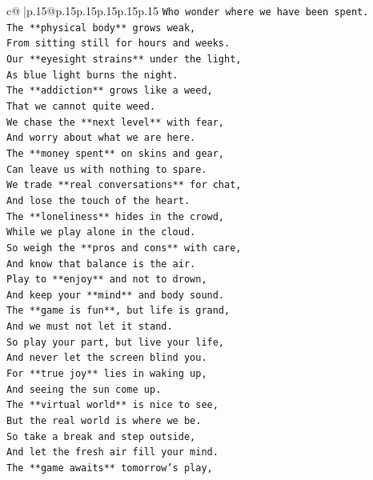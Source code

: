 \documentclass{article}
\begin{document}
{\begin{supertabular}{c@{$\;$}|p{.15\linewidth}@{}p{.15\linewidth}p{.15\linewidth}p{.15\linewidth}p{.15\linewidth}p{.15\linewidth}}
{{{\texttt{Who wonder where we have been spent.} \\
\texttt{The **physical body** grows weak,} \\
\texttt{From sitting still for hours and weeks.} \\
\texttt{Our **eyesight strains** under the light,} \\
\texttt{As blue light burns the night.} \\
\texttt{The **addiction** grows like a weed,} \\
\texttt{That we cannot quite weed.} \\
\texttt{We chase the **next level** with fear,} \\
\texttt{And worry about what we are here.} \\
\texttt{The **money spent** on skins and gear,} \\
\texttt{Can leave us with nothing to spare.} \\
\texttt{We trade **real conversations** for chat,} \\
\texttt{And lose the touch of the heart.} \\
\texttt{The **loneliness** hides in the crowd,} \\
\texttt{While we play alone in the cloud.} \\
\texttt{So weigh the **pros and cons** with care,} \\
\texttt{And know that balance is the air.} \\
\texttt{Play to **enjoy** and not to drown,} \\
\texttt{And keep your **mind** and body sound.} \\
\texttt{The **game is fun**, but life is grand,} \\
\texttt{And we must not let it stand.} \\
\texttt{So play your part, but live your life,} \\
\texttt{And never let the screen blind you.} \\
\texttt{For **true joy** lies in waking up,} \\
\texttt{And seeing the sun come up.} \\
\texttt{The **virtual world** is nice to see,} \\
\texttt{But the real world is where we be.} \\
\texttt{So take a break and step outside,} \\
\texttt{And let the fresh air fill your mind.} \\
\texttt{The **game awaits** tomorrow's play,} \\
}}}
\end{supertabular}}
\end{document}
